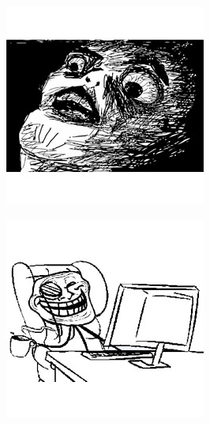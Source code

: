 \begin{multicols}{8}
\begin{center}
\includegraphics[width=\linewidth]{./IMG-GIT/MEMES/Meme-Faces-12.jpg}  
    \end{center}

\begin{center}

\includegraphics[width=\linewidth]{./IMG-GIT/MEMES/Meme-Faces-21.jpg} 
\end{center}


\end{multicols}
